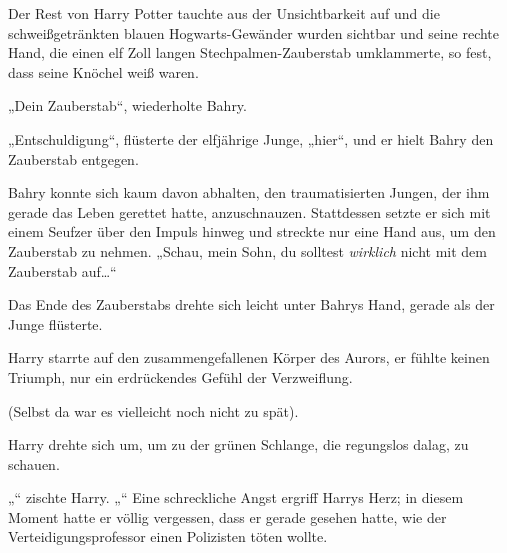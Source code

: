 Der Rest von Harry Potter tauchte aus der Unsichtbarkeit auf und die schweißgetränkten blauen Hogwarts-Gewänder wurden sichtbar und seine rechte Hand, die einen elf Zoll langen Stechpalmen-Zauberstab umklammerte, so fest, dass seine Knöchel weiß waren.

„Dein Zauberstab“, wiederholte Bahry.

„Entschuldigung“, flüsterte der elfjährige Junge, „hier“, und er hielt Bahry den Zauberstab entgegen.

Bahry konnte sich kaum davon abhalten, den traumatisierten Jungen, der ihm gerade das Leben gerettet hatte, anzuschnauzen. Stattdessen setzte er sich mit einem Seufzer über den Impuls hinweg und streckte nur eine Hand aus, um den Zauberstab zu nehmen. „Schau, mein Sohn, du solltest \emph{wirklich} nicht mit dem Zauberstab auf…“

Das Ende des Zauberstabs drehte sich leicht unter Bahrys Hand, gerade als der Junge  flüsterte.

\later

Harry starrte auf den zusammengefallenen Körper des Aurors, er fühlte keinen Triumph, nur ein erdrückendes Gefühl der Verzweiflung.

(Selbst da war es vielleicht noch nicht zu spät).

Harry drehte sich um, um zu der grünen Schlange, die regungslos dalag, zu schauen.

„“ zischte Harry. „“ Eine schreckliche Angst ergriff Harrys Herz; in diesem Moment hatte er völlig vergessen, dass er gerade gesehen hatte, wie der Verteidigungsprofessor einen Polizisten töten wollte.

